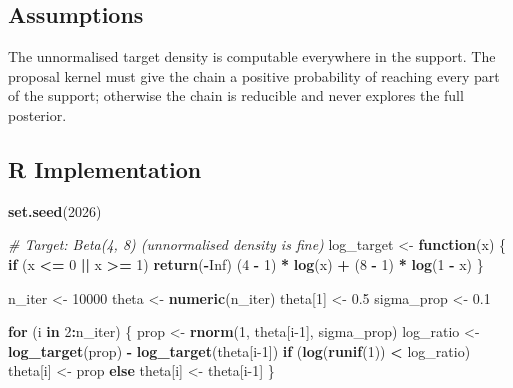 \documentclass[
]{article}
\newenvironment{Shaded}{\begin{snugshade}}{\end{snugshade}}
\newcommand{\CommentTok}[1]{\textcolor[rgb]{0.56,0.35,0.01}{\textit{#1}}}
\newcommand{\ConstantTok}[1]{\textcolor[rgb]{0.56,0.35,0.01}{#1}}
\newcommand{\ControlFlowTok}[1]{\textcolor[rgb]{0.13,0.29,0.53}{\textbf{#1}}}
\newcommand{\DecValTok}[1]{\textcolor[rgb]{0.00,0.00,0.81}{#1}}
\newcommand{\FloatTok}[1]{\textcolor[rgb]{0.00,0.00,0.81}{#1}}
\newcommand{\FunctionTok}[1]{\textcolor[rgb]{0.13,0.29,0.53}{\textbf{#1}}}
\newcommand{\NormalTok}[1]{#1}
\newcommand{\OtherTok}[1]{\textcolor[rgb]{0.56,0.35,0.01}{#1}}
\newcommand{\SpecialCharTok}[1]{\textcolor[rgb]{0.81,0.36,0.00}{\textbf{#1}}}
\begin{document}
\subsection{Assumptions}\label{assumptions}

The unnormalised target density is computable everywhere in the support.
The proposal kernel must give the chain a positive probability of
reaching every part of the support; otherwise the chain is reducible and
never explores the full posterior.

\subsection{R Implementation}\label{r-implementation}

\begin{Shaded}
\begin{Highlighting}[]
\FunctionTok{set.seed}\NormalTok{(}\DecValTok{2026}\NormalTok{)}

\CommentTok{\# Target: Beta(4, 8) (unnormalised density is fine)}
\NormalTok{log\_target }\OtherTok{\textless{}{-}} \ControlFlowTok{function}\NormalTok{(x) \{}
  \ControlFlowTok{if}\NormalTok{ (x }\SpecialCharTok{\textless{}=} \DecValTok{0} \SpecialCharTok{||}\NormalTok{ x }\SpecialCharTok{\textgreater{}=} \DecValTok{1}\NormalTok{) }\FunctionTok{return}\NormalTok{(}\SpecialCharTok{{-}}\ConstantTok{Inf}\NormalTok{)}
\NormalTok{  (}\DecValTok{4} \SpecialCharTok{{-}} \DecValTok{1}\NormalTok{) }\SpecialCharTok{*} \FunctionTok{log}\NormalTok{(x) }\SpecialCharTok{+}\NormalTok{ (}\DecValTok{8} \SpecialCharTok{{-}} \DecValTok{1}\NormalTok{) }\SpecialCharTok{*} \FunctionTok{log}\NormalTok{(}\DecValTok{1} \SpecialCharTok{{-}}\NormalTok{ x)}
\NormalTok{\}}

\NormalTok{n\_iter }\OtherTok{\textless{}{-}} \DecValTok{10000}
\NormalTok{theta }\OtherTok{\textless{}{-}} \FunctionTok{numeric}\NormalTok{(n\_iter)}
\NormalTok{theta[}\DecValTok{1}\NormalTok{] }\OtherTok{\textless{}{-}} \FloatTok{0.5}
\NormalTok{sigma\_prop }\OtherTok{\textless{}{-}} \FloatTok{0.1}

\ControlFlowTok{for}\NormalTok{ (i }\ControlFlowTok{in} \DecValTok{2}\SpecialCharTok{:}\NormalTok{n\_iter) \{}
\NormalTok{  prop }\OtherTok{\textless{}{-}} \FunctionTok{rnorm}\NormalTok{(}\DecValTok{1}\NormalTok{, theta[i}\DecValTok{{-}1}\NormalTok{], sigma\_prop)}
\NormalTok{  log\_ratio }\OtherTok{\textless{}{-}} \FunctionTok{log\_target}\NormalTok{(prop) }\SpecialCharTok{{-}} \FunctionTok{log\_target}\NormalTok{(theta[i}\DecValTok{{-}1}\NormalTok{])}
  \ControlFlowTok{if}\NormalTok{ (}\FunctionTok{log}\NormalTok{(}\FunctionTok{runif}\NormalTok{(}\DecValTok{1}\NormalTok{)) }\SpecialCharTok{\textless{}}\NormalTok{ log\_ratio) theta[i] }\OtherTok{\textless{}{-}}\NormalTok{ prop}
  \ControlFlowTok{else}\NormalTok{ theta[i] }\OtherTok{\textless{}{-}}\NormalTok{ theta[i}\DecValTok{{-}1}\NormalTok{]}
\NormalTok{\}}


\end{Highlighting}
\end{Shaded}
\end{document}
